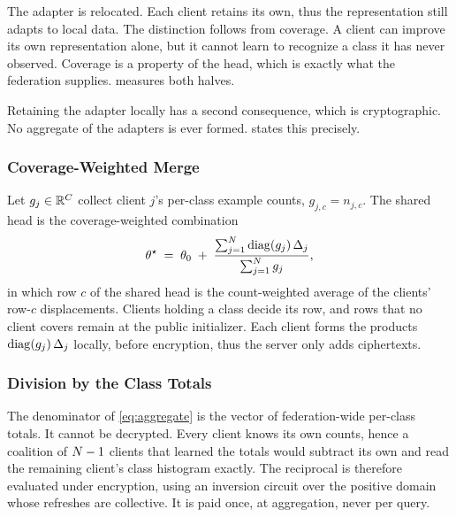 The adapter is relocated. Each client retains its own, thus the representation
still adapts to local data. The distinction follows from coverage. A client can
improve its own representation alone, but it cannot learn to recognize a class it
has never observed. Coverage is a property of the head, which is exactly what the
federation supplies.  measures both halves.

Retaining the adapter locally has a second consequence, which is cryptographic.
No aggregate of the adapters is ever formed.  states this
precisely.

\subsubsection{Coverage-Weighted Merge}
Let $g_{j}\in\mathbb{R}^{C}$ collect client $j$'s per-class example counts,
$g_{j,c}=n_{j,c}$. The shared head is the coverage-weighted combination
\begin{equation}
\label{eq:aggregate}
\theta^{\star} \;=\; \theta_0 \;+\; \frac{\sum_{j=1}^{N} \mathrm{diag}(g_j)\,\Delta_j}
                              {\sum_{j=1}^{N} g_j},
\end{equation}
in which row $c$ of the shared head is the count-weighted average of the clients'
row-$c$ displacements. Clients holding a class decide its row, and rows that no
client covers remain at the public initializer. Each client forms the products
$\mathrm{diag}(g_j)\,\Delta_j$ locally, before encryption, thus the server only adds
ciphertexts.

\subsubsection{Division by the Class Totals}
The denominator of \cref{eq:aggregate} is the vector of federation-wide per-class
totals. It cannot be decrypted. Every client knows its own counts, hence a
coalition of $N-1$ clients that learned the totals would subtract its own and
read the remaining client's class histogram exactly. The reciprocal is therefore
evaluated under encryption, using an inversion circuit over the positive domain
whose refreshes are collective. It is paid once, at aggregation, never per query.

